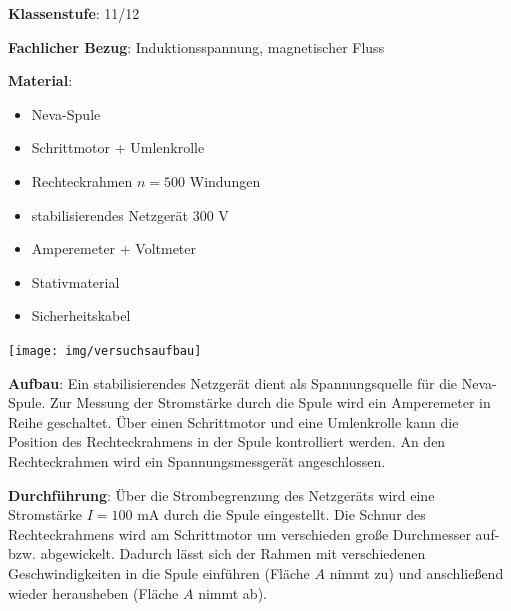 \documentclass[../main.tex]{subfiles}
\begin{document}
\begin{tcolorbox}[
    width=\textwidth,
    height=\textheight,
    title=Versuch: Induktion bei Flächenänderung,
    fonttitle=\Large,
    before title=\vspace{0.2cm}, after title=\vspace{0.2cm},
    colback=white,
    title filled=true, 
    colbacktitle=mygray,
    colframe=black,
    coltitle=black,
    ]

    \vspace{0.2cm}
    \textbf{Klassenstufe}: 11/12

    \vspace{0.4cm}

    \textbf{Fachlicher Bezug}: Induktionsspannung, magnetischer Fluss
    \vspace{0.4cm}

    \begin{minipage}[c]{0.52\textwidth}
        \textbf{Material}:
        \vspace{-0.2cm}
        \begin{itemize}[noitemsep]
            \item Neva-Spule
            \item Schrittmotor + Umlenkrolle
            \item Rechteckrahmen $n=500$ Windungen
            \item stabilisierendes Netzgerät 300 V 
            \item Amperemeter + Voltmeter
            \item Stativmaterial
            \item Sicherheitskabel
        \end{itemize}
    \end{minipage}
    \hspace{0.3cm}
    \begin{minipage}[c]{0.48\textwidth}
        \centering
        \texttt{[image: img/versuchsaufbau]}
    \end{minipage}

    \vspace{0.5cm}
    \textbf{Aufbau}: Ein stabilisierendes Netzgerät dient als Spannungsquelle für die Neva-Spule. Zur Messung der Stromstärke durch die Spule wird ein Amperemeter in Reihe geschaltet. Über einen Schrittmotor und eine Umlenkrolle kann die Position des Rechteckrahmens in der Spule kontrolliert werden. An den Rechteckrahmen wird ein Spannungsmessgerät angeschlossen.  

    \vspace{0.4cm}
    \textbf{Durchführung}: Über die Strombegrenzung des Netzgeräts wird eine Stromstärke $I=100$ mA durch die Spule eingestellt. Die Schnur des Rechteckrahmens wird am Schrittmotor um verschieden große Durchmesser auf- bzw. abgewickelt. Dadurch lässt sich der Rahmen mit verschiedenen Geschwindigkeiten in die Spule einführen (Fläche $A$ nimmt zu) und anschließend wieder herausheben (Fläche $A$ nimmt ab).


\end{tcolorbox}
\end{document}
